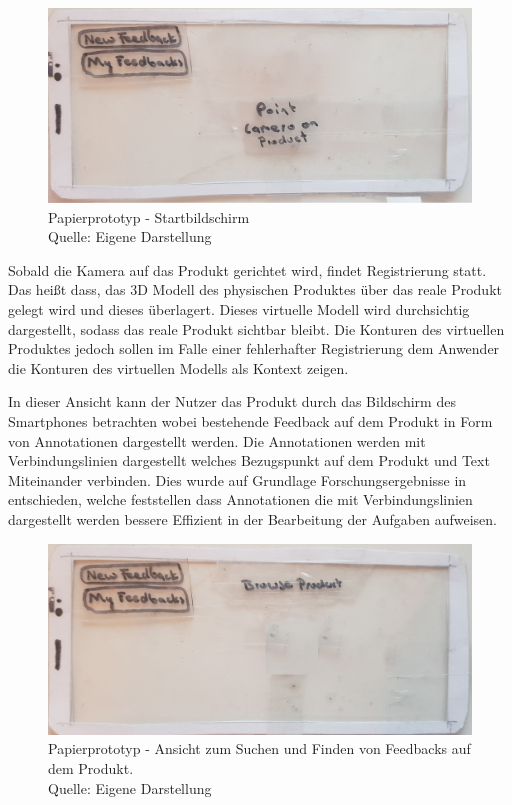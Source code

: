 \begin{figure}[H]
	\centering
	\includegraphics[width=.7\textwidth]{resources/conception/lowfi_startbildschirm.jpg}
	\caption{Papierprototyp - Startbildschirm  \\Quelle: Eigene Darstellung}
	\label{img:pp_start}
\end{figure}

Sobald die Kamera auf das Produkt gerichtet wird, findet Registrierung statt. Das heißt dass, das 3D Modell des physischen Produktes über das reale Produkt gelegt wird und dieses überlagert. 
Dieses virtuelle Modell wird durchsichtig dargestellt, sodass das reale Produkt sichtbar bleibt. Die Konturen des virtuellen Produktes jedoch sollen im Falle einer fehlerhafter Registrierung dem Anwender 
die Konturen des virtuellen Modells als Kontext zeigen.

In dieser Ansicht kann der Nutzer das Produkt durch das Bildschirm des Smartphones betrachten wobei bestehende Feedback auf dem Produkt in Form von Annotationen dargestellt werden. Die Annotationen werden mit Verbindungslinien dargestellt welches Bezugspunkt auf dem Produkt und Text Miteinander verbinden. Dies wurde auf Grundlage Forschungsergebnisse in \cite{Brandenburg2019} \cite{Polys2007} entschieden, welche feststellen dass Annotationen die mit Verbindungslinien dargestellt werden bessere Effizient in der Bearbeitung der Aufgaben aufweisen.

\begin{figure}[H]
	\centering
	\includegraphics[width=.7\textwidth]{resources/conception/lowfi_browseOnProduct.jpg}
	\caption{Papierprototyp - Ansicht zum Suchen und Finden von Feedbacks auf dem Produkt. \\Quelle: Eigene Darstellung}
	\label{img:sysstem_sketch}
\end{figure}

